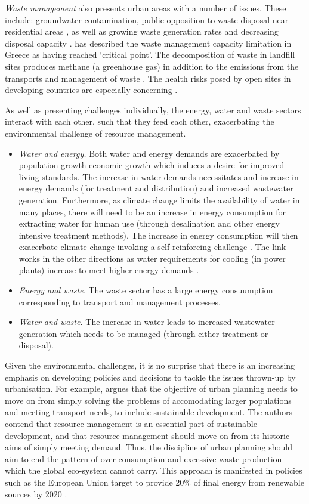 \emph{Waste management} also presents urban areas with a number of issues. These include: groundwater contamination, public opposition to waste disposal near residential areas \citep{Li2006}, as well as growing waste generation rates and decreasing disposal capacity \citep{Lu2009}. \citet{Xydis2012} has described the waste management capacity limitation in Greece as having reached `critical point'. The decomposition of waste in landfill sites produces methane (a greenhouse gas) in addition to the emissions from the transports and management of waste \citep{ICE2011}. The health risks posed by open sites in developing countries are especially concerning \cite{Durand2013}.

As well as presenting challenges individually, the energy, water and waste sectors interact with each other, such that they feed each other, exacerbating the environmental challenge of resource management. 
\begin{itemize}
	\item \emph{Water and energy.} Both water and energy demands are exacerbated by population growth economic growth which induces a desire for improved living standards. The increase in water demands necessitates and increase in energy demands (for treatment and distribution) and increased wastewater generation. Furthermore, as climate change limits the availability of water in many places, there will need to be an increase in energy consumption for extracting water for human use (through desalination and other energy intensive treatment methods). The increase in energy consumption will then exacerbate climate change invoking a self-reinforcing challenge \citet{Webber2011}. The link works in the other directions as water requirements for cooling (in power plants) increase to meet higher energy demands \citep{McMahon2005}.
	\item \emph{Energy and waste.} The waste sector has a large energy consuumption corresponding to transport and management processes.
	\item \emph{Water and waste.} The increase in water leads to increased wastewater generation which needs to be managed (through either treatment or disposal).
\end{itemize}

Given the environmental challenges, it is no surprise that there is an increasing emphasis on developing policies and decisions to tackle the issues thrown-up by urbanisation. For example, \citet{Agudelo-Vera2011} argues that the objective of urban planning needs to move on from simply solving the problems of accomodating larger populations and meeting transport needs, to include sustainable development. The authors contend that resource management is an essential part of sustainable development, and that resource management should move on from its historic aims of simply meeting demand. Thus, the discipline of urban planning should aim to end the pattern of over consumption and excessive waste production which the global eco-system cannot carry. This approach is manifested in policies such as the European Union target to provide 20\% of final energy from renewable sources by 2020 \citep{Keirstead2012}.

